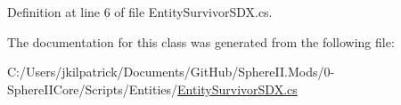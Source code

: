 Definition at line 6 of file Entity\+Survivor\+S\+D\+X.\+cs.



The documentation for this class was generated from the following file\+:\begin{DoxyCompactItemize}
\item 
C\+:/\+Users/jkilpatrick/\+Documents/\+Git\+Hub/\+Sphere\+I\+I.\+Mods/0-\/\+Sphere\+I\+I\+Core/\+Scripts/\+Entities/\mbox{\hyperlink{_entity_survivor_s_d_x_8cs}{Entity\+Survivor\+S\+D\+X.\+cs}}\end{DoxyCompactItemize}
